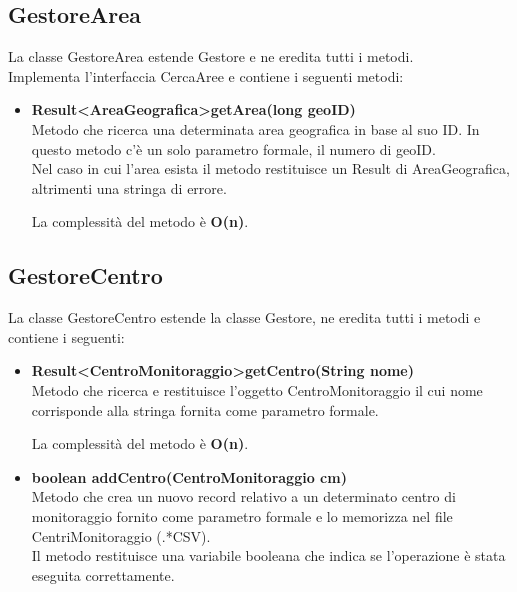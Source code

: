 \documentclass[a4paper, 12pt]{scrreprt}
\begin{document}
			\subsection{GestoreArea}
			La classe GestoreArea estende Gestore e ne eredita tutti i metodi.
			\\ Implementa l'interfaccia CercaAree e contiene i seguenti metodi:
			\begin{itemize}
				\item \textbf{Result\textless AreaGeografica\textgreater getArea(long geoID)}
				\\Metodo che ricerca una determinata area geografica in base al suo ID. In questo metodo c'\`e un solo parametro formale, il numero di geoID.
				\\Nel caso in cui l'area esista il metodo restituisce un Result di AreaGeografica, altrimenti una stringa di errore.
				
				La complessit\`a del metodo \`e \textbf{O(n)}.
			\end{itemize}

			\subsection{GestoreCentro}
			La classe GestoreCentro estende la classe Gestore, ne eredita tutti i metodi e contiene i seguenti:
			\begin{itemize}
				\item \textbf{Result\textless CentroMonitoraggio\textgreater getCentro(String nome)}
				\\Metodo che ricerca e restituisce l'oggetto CentroMonitoraggio il cui nome corrisponde alla stringa fornita come parametro formale.
				
				La complessit\`a del metodo \`e \textbf{O(n)}.
				
				\item \textbf {boolean addCentro(CentroMonitoraggio cm)}
				\\Metodo che crea un nuovo record relativo a un determinato centro di monitoraggio fornito come parametro formale e lo memorizza nel file CentriMonitoraggio (.*CSV).
				\\Il metodo restituisce una variabile booleana che indica se l'operazione \`e stata eseguita correttamente.
			\end{itemize}
\end{document}
